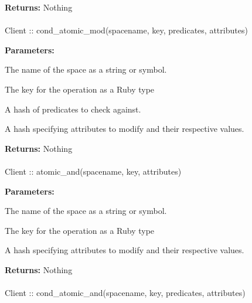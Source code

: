 \noindent\textbf{Returns:}
Nothing

\paragraph{}
\begin{ccode}
Client :: cond_atomic_mod(spacename, key, predicates, attributes)
\end{ccode}
\funcdesc 

\noindent\textbf{Parameters:}
\begin{description}[labelindent=\widthof{{predicates}},leftmargin=*,noitemsep,nolistsep,align=right]
\item[spacename] The name of the space as a string or symbol.
\item[key] The key for the operation as a Ruby type
\item[predicates] A hash of predicates to check against.
\item[attributes] A hash specifying attributes to modify and their respective values.
\end{description}

\noindent\textbf{Returns:}
Nothing

\paragraph{}
\begin{ccode}
Client :: atomic_and(spacename, key, attributes)
\end{ccode}
\funcdesc 

\noindent\textbf{Parameters:}
\begin{description}[labelindent=\widthof{{attributes}},leftmargin=*,noitemsep,nolistsep,align=right]
\item[spacename] The name of the space as a string or symbol.
\item[key] The key for the operation as a Ruby type
\item[attributes] A hash specifying attributes to modify and their respective values.
\end{description}

\noindent\textbf{Returns:}
Nothing

\paragraph{}
\begin{ccode}
Client :: cond_atomic_and(spacename, key, predicates, attributes)
\end{ccode}
\funcdesc 

